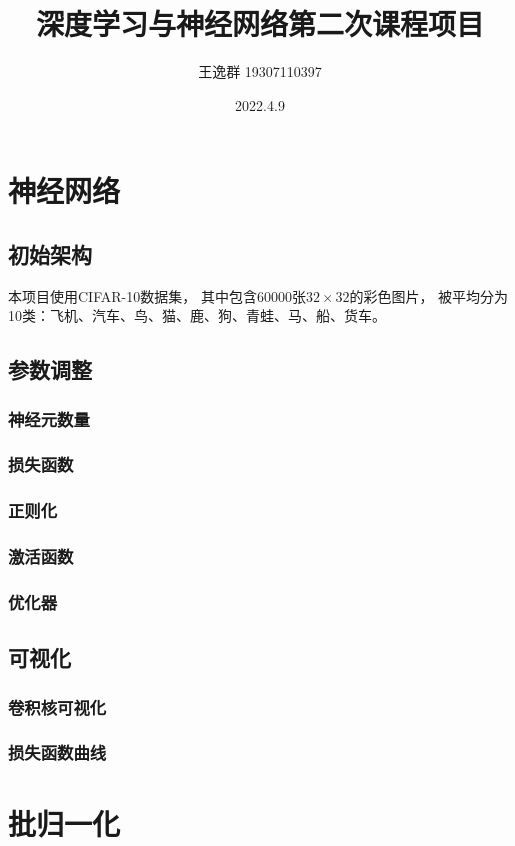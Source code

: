 \documentclass{article}
\title{深度学习与神经网络第二次课程项目}
\author{王逸群 19307110397}
\date{2022.4.9}
\begin{document}
	
\maketitle

\section{神经网络}

\subsection{初始架构}

本项目使用CIFAR-10数据集，
其中包含60000张$32\times32$的彩色图片，
被平均分为10类：飞机、汽车、鸟、猫、鹿、狗、青蛙、马、船、货车。

\subsection{参数调整}

\subsubsection{神经元数量}

\subsubsection{损失函数}

\subsubsection{正则化}

\subsubsection{激活函数}

\subsubsection{优化器}

\subsection{可视化}

\subsubsection{卷积核可视化}

\subsubsection{损失函数曲线}

\section{批归一化}
	
\end{document}
